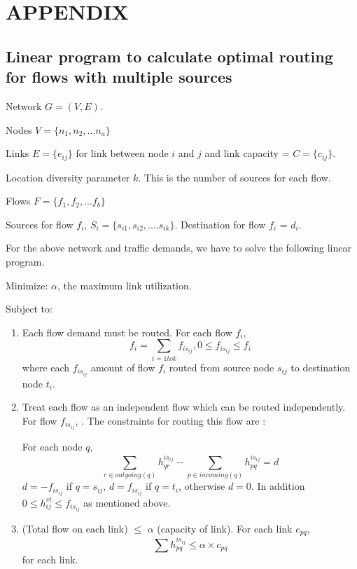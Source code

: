 \section{APPENDIX}
\label{sec:appendix}
\subsection{Linear program to calculate optimal routing for flows with multiple sources}
Network  $G = (V,E)$.

Nodes $V = \{ n_1, n_2, ... n_a  \}$

Links $ E = \{ e_{ij}\}$ for link between node $i$ and  $j$ and link capacity = $ C = \{ c_{ij}\}$.

Location diversity parameter $k$. This is the number of sources for each flow.

Flows $F = \{f_1, f_2, ... f_b\}$ 

Sources for flow $f_i$, $S_i = \{ s_{i1},s_{i2},....s_{ik} \}$. Destination for flow $f_i$ = $d_i$.


For the above network and traffic demands, we have to solve the following linear program.


Minimize:  $\alpha$, the maximum link utilization.

Subject to:
\begin{enumerate}
\item 
Each flow demand must be routed. For each flow $f_i$,
\[ f_i = \sum_{i = 1 to k }  f_{is_{ij}}, 0 \leq  f_{is_{ij}} \leq f_i \]
where each $f_{is_{ij}}$ amount of flow $f_i$ routed from source node $s_{ij}$ to destination node $t_i$. 

\item 
Treat each flow as an independent flow which can be routed independently. For flow $f_{is_{ij}}$, . The constraints for routing this flow are :

For each node $q$,
\[ \sum_{r \in outgoing(q)} h_{qr}^{is_{ij}} - \sum_{p \in incoming(q)} h_{pq}^{is_{ij}} = d\]
$d = -f_{is_{ij}}$ if $q = s_{ij}$, $d = f_{is_{ij}}$ if $q = t_i$, otherwise $d = 0$. In addition $0 \leq h_{ij}^{st} \leq f_{is_{ij}}$ as mentioned above.

\item
(Total flow on each link) $\leq $ $\alpha $ (capacity of link). For each link $e_{pq}$, 
\[ \sum h_{pq}^{is_{ij}} \leq \alpha \times c_{pq} \]
for each link.

\end{enumerate}

